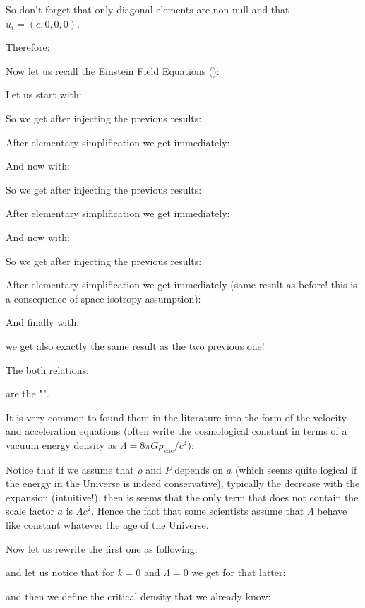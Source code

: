 	So don't forget that only diagonal elements are non-null and that $u_i=(c,0,0,0)$.
	
	Therefore:
	
	Now let us recall the Einstein Field Equations ():
	
	Let us start with:
	
	So we get after injecting the previous results:
	
	After elementary simplification we get immediately:
	
	And now with:
	
	So we get after injecting the previous results:
	
	After elementary simplification we get immediately:
	
	
	And now with:
	
	So we get after injecting the previous results:
	
	After elementary simplification we get immediately (same result as before! this is a consequence of space isotropy assumption):
	
	
	And finally with:
	
	we get also exactly the same result as the two previous one!
	
	The both relations:
	
	are the "\label{general Friedmann equations}".
	
	It is very common to found them in the literature into the form of the velocity and acceleration equations (often write the cosmological constant in terms of a vacuum energy density as $\Lambda=8\pi G\rho_\text{vac}/c^4$):
	
	\begin{tcolorbox}[title=Remark,colframe=black,arc=10pt]
	Notice that if we assume that $\rho$ and $P$ depends on $a$ (which seems quite logical if the energy in the Universe is indeed conservative), typically the decrease with the expansion (intuitive!), then is seems that the only term that does not contain the scale factor $a$ is $\Lambda c^2$. Hence the fact that some scientists assume that $\Lambda$ behave like constant whatever the age of the Universe.
	\end{tcolorbox}
	Now let us rewrite the first one as following:
	
	and let us notice that for $k=0$ and $\Lambda=0$ we get for that latter:
	
	and then we define the critical density that we already know:
	
